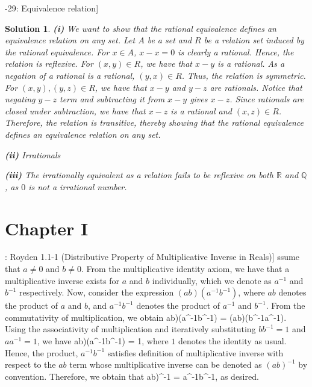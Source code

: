 \documentclass{article} %
\def\eQb#1\eQe{\begin{eqnarray*}#1\end{eqnarray*}}
\def\Qb#1\Qe{\begin{question}#1\end{question}}
\def\Sb#1\Se{\begin{solution}#1\end{solution}}
\theoremstyle{quest}
\newtheorem*{question}{Question}
\newtheorem*{solution}{Solution}
\begin{document}
\bigskip

\Qb[2.6-29: Equivalence relation]
\Qe
\begin{solution}
\textbf{(i)} We want to show that the rational equivalence defines an equivalence 
relation on any set. Let $A$ be a set and $R$ be a relation set induced by 
the rational equivalence. For $x \in A$, $x - x = 0$ is clearly a rational.
Hence, the relation is reflexive. For $(x,y) \in R$, we have that $x-y$ is a rational.
As a negation of a rational is a rational, $(y,x) \in R$. Thus, the relation is symmetric.
For $(x,y), (y,z) \in R$, we have that $x-y$ and $y-z$ are rationals. Notice that
negating $y-z$ term and subtracting it from $x-y$ gives $x-z$. Since rationals are closed
under subtraction, we have that $x-z$ is a rational and $(x,z) \in R$. Therefore, the relation
is transitive, thereby showing that the rational equivalence defines an equivalence relation 
on any set. \\

\smallskip

\textbf{(ii)} Irrationals  

\smallskip

\textbf{(iii)} The irrationally equivalent as a relation fails to be reflexive on both 
$\mathbb{R}$ and $\mathbb{Q}$, as $0$ is not a irrational number.

\end{solution}


\section{Chapter I}

\Qb[: Royden 1.1-1 (Distributive Property of Multiplicative Inverse in Reals)]
\Qe
\Sb
Assume that $a \neq 0$ and $b \neq 0$. From the multiplicative identity axiom,
we have that a multiplicative inverse exists for $a$ and $b$ individually, which we denote as
$a^{-1}$ and $b^{-1}$ respectively.
Now, consider the expression $(ab)(a^{-1}b^{-1})$, where $ab$ denotes the 
product of $a$ and $b$, and $a^{-1}b^{-1}$ denotes the product of $a^{-1}$ and $b^{-1}$.
From the commutativity of multiplication,
we obtain
\eQb
(ab)(a^{-1}b^{-1}) = (ab)(b^{-1}a^{-1}).
\eQe
Using the associativity of multiplication and iteratively substituting $bb^{-1} = 1$ and $aa^{-1} = 1$,
we have
\eQb
(ab)(a^{-1}b^{-1}) = 1,
\eQe
where $1$ denotes the identity as usual. Hence, the product, $a^{-1}b^{-1}$ satisfies definition
of multiplicative inverse with respect to the $ab$ term whose multiplicative inverse can be denoted
as $(ab)^{-1}$ by convention. Therefore, we obtain that
\eQb
(ab)^{-1} = a^{-1}b^{-1},
\eQe
as desired.
\Se
\end{document}
